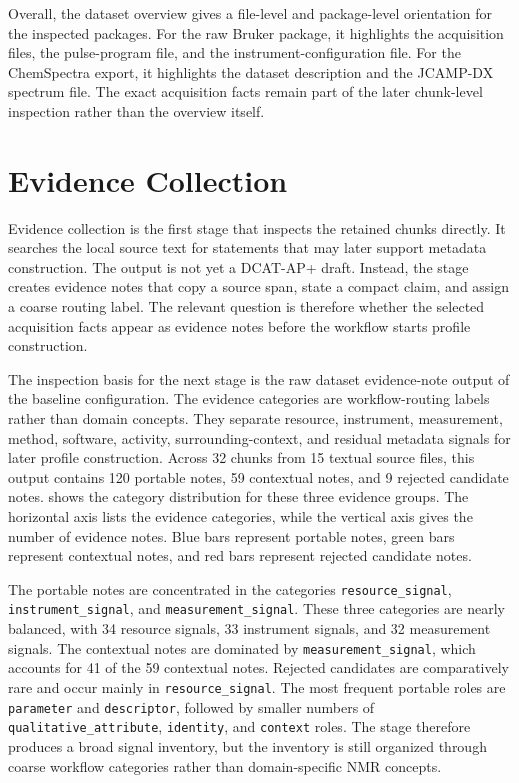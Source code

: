 Overall, the dataset overview gives a file-level and package-level orientation for the inspected packages.
For the raw Bruker package, it highlights the acquisition files, the pulse-program file, and the instrument-configuration file.
For the ChemSpectra export, it highlights the dataset description and the \ac{JCAMP-DX} spectrum file.
The exact acquisition facts remain part of the later chunk-level inspection rather than the overview itself.

\section{Evidence Collection}
\label{sec:evaluation-evidence-collection-observations}

Evidence collection is the first stage that inspects the retained chunks directly.
It searches the local source text for statements that may later support metadata construction.
The output is not yet a \ac{DCAT-AP+} draft.
Instead, the stage creates evidence notes that copy a source span, state a compact claim, and assign a coarse routing label.
The relevant question is therefore whether the selected acquisition facts appear as evidence notes before the workflow starts profile construction.

The inspection basis for the next stage is the raw dataset evidence-note output of the baseline configuration.
The evidence categories are workflow-routing labels rather than domain concepts.
They separate resource, instrument, measurement, method, software, activity, surrounding-context, and residual metadata signals for later profile construction.
Across 32 chunks from 15 textual source files, this output contains 120 portable notes, 59 contextual notes, and 9 rejected candidate notes.
 shows the category distribution for these three evidence groups.
The horizontal axis lists the evidence categories, while the vertical axis gives the number of evidence notes.
Blue bars represent portable notes, green bars represent contextual notes, and red bars represent rejected candidate notes.

The portable notes are concentrated in the categories \texttt{resource\_\allowbreak{}signal}, \texttt{instrument\_\allowbreak{}signal}, and \texttt{measurement\_\allowbreak{}signal}.
These three categories are nearly balanced, with 34 resource signals, 33 instrument signals, and 32 measurement signals.
The contextual notes are dominated by \texttt{measurement\_\allowbreak{}signal}, which accounts for 41 of the 59 contextual notes.
Rejected candidates are comparatively rare and occur mainly in \texttt{resource\_\allowbreak{}signal}.
The most frequent portable roles are \texttt{parameter} and \texttt{descriptor}, followed by smaller numbers of \texttt{qualitative\_\allowbreak{}attribute}, \texttt{identity}, and \texttt{context} roles.
The stage therefore produces a broad signal inventory, but the inventory is still organized through coarse workflow categories rather than domain-specific \ac{NMR} concepts.

